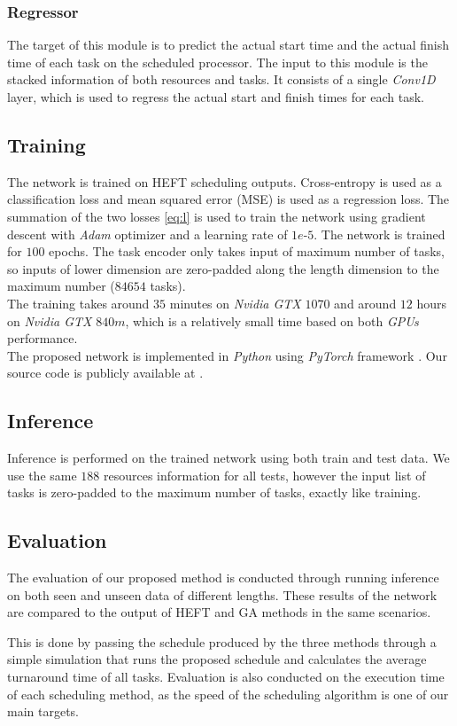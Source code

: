\subsubsection{Regressor}
The target of this module is to predict the actual start time and the actual finish time of each task on the scheduled processor. The input to this module is the stacked information of both resources and tasks. It consists of a single \emph{Conv1D} layer, which is used to regress the actual start and finish times for each task. 

\subsection{Training}
The network is trained on HEFT scheduling outputs. Cross-entropy is used as a classification loss and mean squared error (MSE) is used as a regression loss. The summation of the two losses \ref{eq:l} is used to train the network using gradient descent with \emph{Adam} optimizer and a learning rate of $1e$-$5$. The network is trained for $100$ epochs. The task encoder only takes input of maximum number of tasks, so inputs of lower dimension are zero-padded along the length dimension to the maximum number ($84654$ tasks). \\

The training takes around $35$ minutes on \emph{Nvidia GTX} $1070$ and around $12$ hours on \emph{Nvidia GTX} $840m$, which is a relatively small time based on both \emph{GPUs} performance. \\

The proposed network is implemented in \emph{Python} using \emph{PyTorch} framework \cite{paszke2019pytorch}.  Our source code is publicly available at .

\subsection{Inference}
Inference is performed on the trained network using both train and test data. We use the same $188$ resources information for all tests, however the input list of tasks is zero-padded to the maximum number of tasks, exactly like training.

\subsection{Evaluation}
The evaluation of our proposed method is conducted through running inference on both seen and unseen data of different lengths. These results of the network are compared to the output of HEFT and GA methods in the same scenarios. 

This is done by passing the schedule produced by the three methods through a simple simulation that runs the proposed schedule and calculates the average turnaround time of all tasks. Evaluation is also conducted on the execution time of each scheduling method, as the speed of the scheduling algorithm is one of our main targets.
